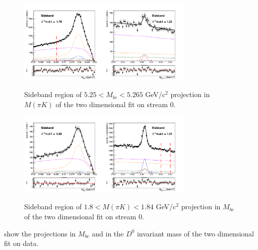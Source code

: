   \begin{figure}[H]
{\includegraphics[width=0.75\textwidth]{A2-Appendix/figs/Mbc_Sideband_Total_2DFit_stream0_free_sigmas.png}}
\caption{Sideband region of $5.25 < M_{bc} < 5.265$ GeV/c$^2$ projection in $M(\pi K)$  of the two dimensional fit on stream 0.}
\label{fig:Mbc_Sideband_Total_2DFit_stream0}
\end{figure}
 
 \begin{figure}[H]
{\includegraphics[width=0.75\textwidth]{A2-Appendix/figs/InvM_Sideband_Total_2DFit_stream0_free_sigmas.png}}
\caption{Sideband region of $1.8 < M(\pi K) < 1.84$ GeV/c$^2$ projection in $M_{bc}$ of the two dimensional fit on stream 0. }
\label{fig:InvM_Sideband_Total_2DFit_stream0}
\end{figure}

 show the projections in $ M_{bc}$ and in the $D^0$ invariant mass of the two dimensional fit on data.





